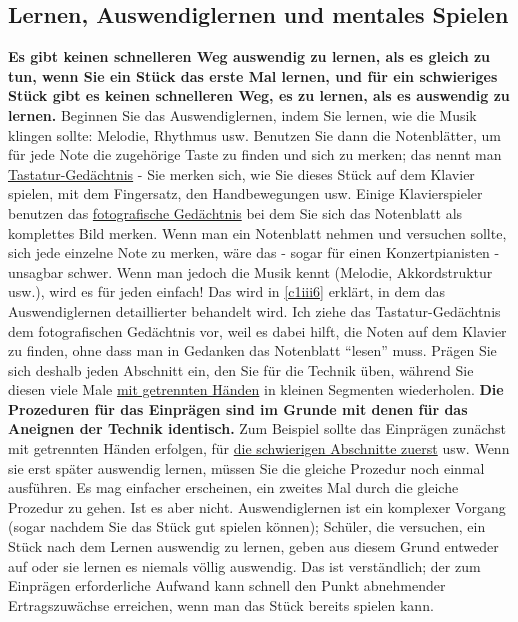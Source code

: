 
\label{c1ii12}


\subsection{Lernen, Auswendiglernen und mentales Spielen}

\textbf{Es gibt keinen schnelleren Weg auswendig zu lernen, als es gleich zu tun, wenn Sie ein Stück das erste Mal lernen, und für ein schwieriges Stück gibt es keinen schnelleren Weg, es zu lernen, als es auswendig zu lernen.}
Beginnen Sie das Auswendiglernen, indem Sie lernen, wie die Musik klingen sollte: Melodie, Rhythmus usw.
Benutzen Sie dann die Notenblätter, um für jede Note die zugehörige Taste zu finden und sich zu merken; das nennt man \hyperref[c1iii6tastatur]{Tastatur-Gedächtnis} - Sie merken sich, wie Sie dieses Stück auf dem Klavier spielen, mit dem Fingersatz, den Handbewegungen usw.
Einige Klavierspieler benutzen das \hyperref[c1iii6foto]{fotografische Gedächtnis} bei dem Sie sich das Notenblatt als komplettes Bild merken.
Wenn man ein Notenblatt nehmen und versuchen sollte, sich jede einzelne Note zu merken, wäre das - sogar für einen Konzertpianisten - unsagbar schwer.
Wenn man jedoch die Musik kennt (Melodie, Akkordstruktur usw.), wird es für jeden einfach!
Das wird in \hyperref[c1iii6]{\autoref{c1iii6}} erklärt, in dem das Auswendiglernen detaillierter behandelt wird.
Ich ziehe das Tastatur-Gedächtnis dem fotografischen Gedächtnis vor, weil es dabei hilft, die Noten auf dem Klavier zu finden, ohne dass man in Gedanken das Notenblatt \enquote{lesen} muss.
Prägen Sie sich deshalb jeden Abschnitt ein, den Sie für die Technik üben, während Sie diesen viele Male \hyperref[c1ii7]{mit getrennten Händen} in kleinen Segmenten wiederholen.
\textbf{Die Prozeduren für das Einprägen sind im Grunde mit denen für das Aneignen der Technik identisch.}
Zum Beispiel sollte das Einprägen zunächst mit getrennten Händen erfolgen, für \hyperref[c1ii5]{die schwierigen Abschnitte zuerst} usw.
Wenn sie erst später auswendig lernen, müssen Sie die gleiche Prozedur noch einmal ausführen.
Es mag einfacher erscheinen, ein zweites Mal durch die gleiche Prozedur zu gehen.
Ist es aber nicht.
Auswendiglernen ist ein komplexer Vorgang (sogar nachdem Sie das Stück gut spielen können); Schüler, die versuchen, ein Stück nach dem Lernen auswendig zu lernen, geben aus diesem Grund entweder auf oder sie lernen es niemals völlig auswendig.
Das ist verständlich; der zum Einprägen erforderliche Aufwand kann schnell den Punkt abnehmender Ertragszuwächse erreichen, wenn man das Stück bereits spielen kann.

